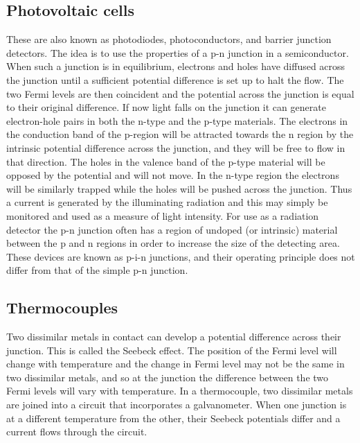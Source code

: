 
\subsection{Photovoltaic cells}
These are also known as photodiodes,
photoconductors, and barrier junction detectors. The idea is to use the
properties of a p-n junction in a semiconductor. When such a junction
is in equilibrium, electrons and holes have diffused across the
junction until a sufficient potential difference is set up to halt the
flow. The two Fermi levels are then coincident and the potential
across the junction is equal to their original difference. If now
light falls on the junction it can generate electron-hole pairs in
both the n-type and the p-type materials. The electrons in the
conduction band of the p-region will be attracted towards the n region
by the intrinsic potential difference across the junction, and they
will be free to flow in that direction. The holes in the valence band
of the p-type material will be opposed by the potential and will not
move. In the n-type region the electrons will be similarly trapped
while the holes will be pushed across the junction. Thus a current is
generated by the illuminating radiation and this may simply be
monitored and used as a measure of light intensity. For use as a
radiation detector the p-n junction often has a region of undoped (or
intrinsic) material between the p and n regions in order to increase
the size of the detecting area. These devices are known as p-i-n
junctions, and their operating principle does not differ from that of
the simple p-n junction.

\subsection{Thermocouples}
Two dissimilar metals in contact can
develop a potential difference across their junction. This is called
the Seebeck effect. The position of the Fermi level will change with
temperature and the change in Fermi level may not be the same in two
dissimilar metals, and so at the junction the difference between the
two Fermi levels will vary with temperature. In a thermocouple, two
dissimilar metals are joined into a circuit that incorporates a
galvanometer. When one junction is at a different temperature from the
other, their Seebeck potentials differ and a current flows through the
circuit. 

